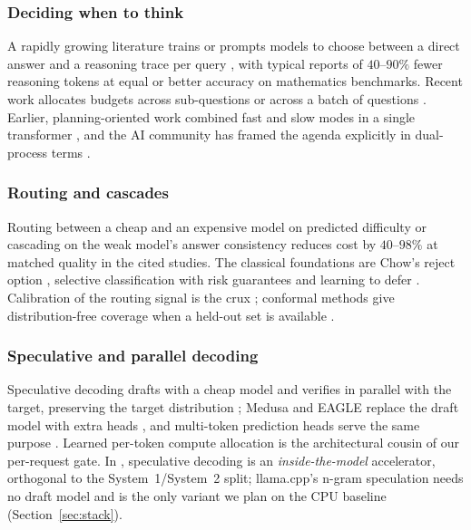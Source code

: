 \subsubsection{Deciding when to think}
A rapidly growing literature trains or prompts models to choose between a
direct answer and a reasoning trace per query
\cite{zhang2025adaptthink,fang2025thinkless,he2025selfroute,hou2025thinkprune,yang2025deer,arora2025efficient},
with typical reports of $40$--$90\%$ fewer reasoning tokens at equal or better
accuracy on mathematics benchmarks. Recent work allocates budgets across
sub-questions or across a batch of questions
\cite{lin2026planbudget,zhai2026adaptive,fan2026thinkinghard,zhou2026bet,xu2026stableadaptive,guo2026thinkwhenneeded}.
Earlier, planning-oriented work combined fast and slow modes in a single
transformer \cite{su2025dualformer,saha2025system1x}, and the AI community has
framed the agenda explicitly in dual-process terms
\cite{booch2021thinking,bengio2019system2}.

\subsubsection{Routing and cascades}
Routing between a cheap and an expensive model on predicted difficulty
\cite{ding2024hybridllm,ong2025routellm} or cascading on the weak model's
answer consistency \cite{yue2024cascades,chen2023frugalgpt} reduces cost by
$40$--$98\%$ at matched quality in the cited studies. The classical
foundations are Chow's reject option \cite{chow1970reject}, selective
classification with risk guarantees \cite{geifman2017selective} and learning
to defer \cite{madras2018defer,mozannar2020defer}. Calibration of the routing
signal is the crux \cite{guo2017calibration,kadavath2022know,tian2023calibration};
conformal methods give distribution-free coverage when a held-out set is
available \cite{angelopoulos2023conformal}.

\subsubsection{Speculative and parallel decoding}
Speculative decoding drafts with a cheap model and verifies in parallel with
the target, preserving the target distribution
\cite{leviathan2023speculative,chen2023speculative}; Medusa and EAGLE replace
the draft model with extra heads \cite{cai2024medusa,li2024eagle}, and
multi-token prediction heads serve the same purpose
\cite{gloeckle2024mtp}. Learned per-token compute allocation
\cite{graves2016act,raposo2024mod} is the architectural cousin of our
per-request gate. In \Sys, speculative decoding is an \emph{inside-the-model}
accelerator, orthogonal to the System~1/System~2 split; llama.cpp's n-gram
speculation needs no draft model and is the only variant we plan on the CPU
baseline (Section~\ref{sec:stack}).

